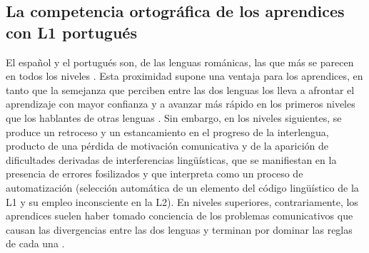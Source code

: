 \documentclass[spanish]{textolivre}
\begin{document}
\subsection{La competencia ortográfica de los aprendices con L1 portugués}\label{sec-conduta}
El español y el portugués son, de las lenguas románicas, las que más se parecen en todos los niveles \cite{almeida_uma_1995}. Esta proximidad supone una ventaja para los aprendices, en tanto que la semejanza que perciben entre las dos lenguas los lleva a afrontar el aprendizaje con mayor confianza y a avanzar más rápido en los primeros niveles que los hablantes de otras lenguas \cite{capilla_o_2009}. Sin embargo, en los niveles siguientes, se produce un retroceso y un estancamiento en el progreso de la interlengua, producto de una pérdida de motivación comunicativa y de la aparición de dificultades derivadas de interferencias lingüísticas, que se manifiestan en la presencia de errores fosilizados \cite[p. 2]{capilla_o_2009} y que \textcite{dominguez_vazquez_en_2001} interpreta como un proceso de automatización (selección automática de un elemento del código lingüístico de la L1 y su empleo inconsciente en la L2). En niveles superiores, contrariamente, los aprendices suelen haber tomado conciencia de los problemas comunicativos que causan las divergencias entre las dos lenguas y terminan por dominar las reglas de cada una \cite{torijano_errores_2004}.
\end{document}
